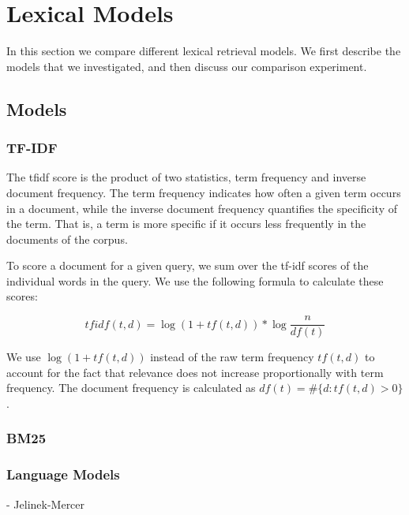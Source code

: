 \section{Lexical Models}

In this section we compare different lexical retrieval models.
We first describe the models that we investigated,
and then discuss our comparison experiment.

\subsection{Models}


\subsubsection{TF-IDF}

The tf\textendash idf score is the product of two statistics, 
term frequency and inverse document frequency.
The term frequency indicates how often a given term occurs in a document,
while the inverse document frequency quantifies the specificity of the term.
That is, a term is more specific if it occurs less frequently in the documents of the corpus.  

To score a document for a given query, 
we sum over the tf-idf scores of the individual words in the query.
We use the following formula to calculate these scores: 

\begin{equation*}
tfidf(t,d) = \log(1 + tf(t,d)) * \log\frac{n}{df(t)}
\end{equation*}

We use $\log(1 + tf(t,d))$ instead of the raw term frequency $tf(t,d)$
to account for the fact that relevance	does not increase proportionally with term	
frequency. The document frequency is calculated as $df(t) = \#\{d:tf(t,d) > 0\}$.



\subsubsection{BM25}

\subsubsection{Language Models}

- Jelinek-Mercer

